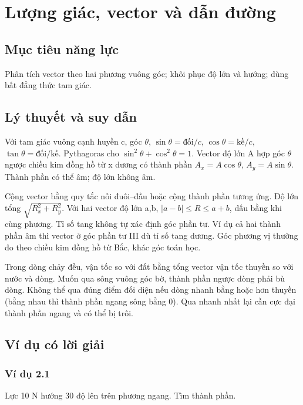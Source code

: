 \documentclass[11pt,a4paper,openany]{book}
\begin{document}
\chapter{Lượng giác, vector và dẫn đường}
\section{Mục tiêu năng lực}
Phân tích vector theo hai phương vuông góc; khôi phục độ lớn và hướng; dùng bất đẳng thức tam giác.
\section{Lý thuyết và suy dẫn}
Với tam giác vuông cạnh huyền c, góc $\theta$, $\sin\theta=\text{đối}/c$, $\cos\theta=\text{kề}/c$, $\tan\theta=\text{đối}/\text{kề}$. Pythagoras cho $\sin^2\theta+\cos^2\theta=1$. Vector độ lớn A hợp góc $\theta$ ngược chiều kim đồng hồ từ x dương có thành phần $A_x=A\cos\theta$, $A_y=A\sin\theta$. Thành phần có thể âm; độ lớn không âm.

Cộng vector bằng quy tắc nối đuôi–đầu hoặc cộng thành phần tương ứng. Độ lớn tổng $\sqrt{R_x^2+R_y^2}$. Với hai vector độ lớn a,b, $|a-b|\le R\le a+b$, dấu bằng khi cùng phương. Tỉ số tang không tự xác định góc phần tư. Ví dụ cả hai thành phần âm thì vector ở góc phần tư III dù tỉ số tang dương. Góc phương vị thường đo theo chiều kim đồng hồ từ Bắc, khác góc toán học.

Trong dòng chảy đều, vận tốc so với đất bằng tổng vector vận tốc thuyền so với nước và dòng. Muốn qua sông vuông góc bờ, thành phần ngược dòng phải bù dòng. Không thể qua đúng điểm đối diện nếu dòng nhanh bằng hoặc hơn thuyền (bằng nhau thì thành phần ngang sông bằng 0). Qua nhanh nhất lại cần cực đại thành phần ngang và có thể bị trôi.
\begin{center}
\end{center}
\section{Ví dụ có lời giải}
\subsection*{Ví dụ 2.1}
Lực 10 N hướng 30 độ lên trên phương ngang. Tìm thành phần.
\end{document}

